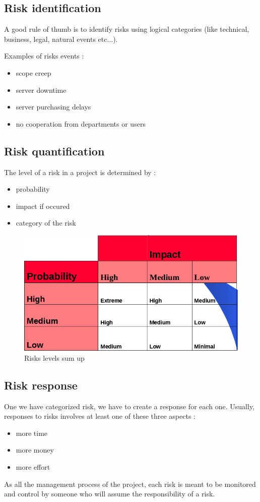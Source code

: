 \documentclass{article}
\begin{document}
\subsection{Risk identification}
A good rule of thumb is to identify risks using logical categories (like technical, business, legal, natural events etc...).\newline

Examples of risks events :
\begin{itemize}
	\item scope creep
	\item server downtime
	\item server purchasing delays
	\item no cooperation from departments or users
\end{itemize}



\subsection{Risk quantification}
The level of a risk in a project is determined by :
\begin{itemize}
	\item probability
	\item impact if occured
	\item category of the risk
\end{itemize}

\begin{figure}[h]
	\centering
	\includegraphics[scale=0.5]{riskLevel.png}
	\caption{Risks levels sum up}
\end{figure}

\subsection{Risk response}
One we have categorized risk, we have to create a response for each one. Usually, responses to risks involves at least one of these three aspects :
   \begin{itemize}
       \item more time
       \item more money
       \item more effort
   \end{itemize}
As all the management process of the project, each risk is meant to be monitored and control by someone who will assume the responsibility of a risk.
\end{document}
